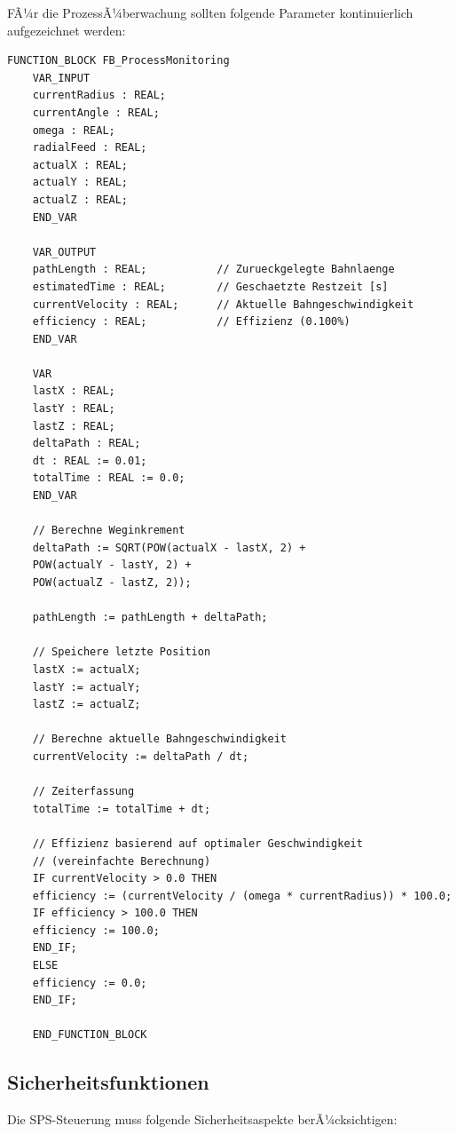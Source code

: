 ﻿\documentclass[12pt,a4paper]{article}
\begin{document}
FÃ¼r die ProzessÃ¼berwachung sollten folgende Parameter kontinuierlich aufgezeichnet werden:

\begin{lstlisting}[style=structuredtext, caption={Monitoring-Funktionsbaustein}, label={lst:monitor}]
	FUNCTION_BLOCK FB_ProcessMonitoring
	VAR_INPUT
	currentRadius : REAL;
	currentAngle : REAL;
	omega : REAL;
	radialFeed : REAL;
	actualX : REAL;
	actualY : REAL;
	actualZ : REAL;
	END_VAR
	
	VAR_OUTPUT
	pathLength : REAL;           // Zurueckgelegte Bahnlaenge
	estimatedTime : REAL;        // Geschaetzte Restzeit [s]
	currentVelocity : REAL;      // Aktuelle Bahngeschwindigkeit
	efficiency : REAL;           // Effizienz (0.100%)
	END_VAR
	
	VAR
	lastX : REAL;
	lastY : REAL;
	lastZ : REAL;
	deltaPath : REAL;
	dt : REAL := 0.01;
	totalTime : REAL := 0.0;
	END_VAR
	
	// Berechne Weginkrement
	deltaPath := SQRT(POW(actualX - lastX, 2) + 
	POW(actualY - lastY, 2) + 
	POW(actualZ - lastZ, 2));
	
	pathLength := pathLength + deltaPath;
	
	// Speichere letzte Position
	lastX := actualX;
	lastY := actualY;
	lastZ := actualZ;
	
	// Berechne aktuelle Bahngeschwindigkeit
	currentVelocity := deltaPath / dt;
	
	// Zeiterfassung
	totalTime := totalTime + dt;
	
	// Effizienz basierend auf optimaler Geschwindigkeit
	// (vereinfachte Berechnung)
	IF currentVelocity > 0.0 THEN
	efficiency := (currentVelocity / (omega * currentRadius)) * 100.0;
	IF efficiency > 100.0 THEN
	efficiency := 100.0;
	END_IF;
	ELSE
	efficiency := 0.0;
	END_IF;
	
	END_FUNCTION_BLOCK
\end{lstlisting}

\subsection{Sicherheitsfunktionen}

Die SPS-Steuerung muss folgende Sicherheitsaspekte berÃ¼cksichtigen:
\end{document}
